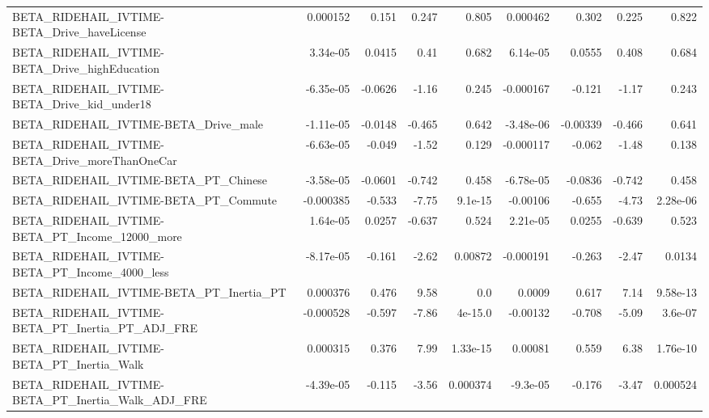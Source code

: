 \begin{tabular}{lrrrrrrrr}
BETA\_RIDEHAIL\_IVTIME-BETA\_Drive\_haveLicense        &    0.000152 &        0.151 &    0.247 &    0.805 &   0.000462 &       0.302 &        0.225 &         0.822 \\
BETA\_RIDEHAIL\_IVTIME-BETA\_Drive\_highEducation      &    3.34e-05 &       0.0415 &     0.41 &    0.682 &   6.14e-05 &      0.0555 &        0.408 &         0.684 \\
BETA\_RIDEHAIL\_IVTIME-BETA\_Drive\_kid\_under18        &   -6.35e-05 &      -0.0626 &    -1.16 &    0.245 &  -0.000167 &      -0.121 &        -1.17 &         0.243 \\
BETA\_RIDEHAIL\_IVTIME-BETA\_Drive\_male               &   -1.11e-05 &      -0.0148 &   -0.465 &    0.642 &  -3.48e-06 &    -0.00339 &       -0.466 &         0.641 \\
BETA\_RIDEHAIL\_IVTIME-BETA\_Drive\_moreThanOneCar     &   -6.63e-05 &       -0.049 &    -1.52 &    0.129 &  -0.000117 &      -0.062 &        -1.48 &         0.138 \\
BETA\_RIDEHAIL\_IVTIME-BETA\_PT\_Chinese               &   -3.58e-05 &      -0.0601 &   -0.742 &    0.458 &  -6.78e-05 &     -0.0836 &       -0.742 &         0.458 \\
BETA\_RIDEHAIL\_IVTIME-BETA\_PT\_Commute               &   -0.000385 &       -0.533 &    -7.75 &  9.1e-15 &   -0.00106 &      -0.655 &        -4.73 &      2.28e-06 \\
BETA\_RIDEHAIL\_IVTIME-BETA\_PT\_Income\_12000\_more     &    1.64e-05 &       0.0257 &   -0.637 &    0.524 &   2.21e-05 &      0.0255 &       -0.639 &         0.523 \\
BETA\_RIDEHAIL\_IVTIME-BETA\_PT\_Income\_4000\_less      &   -8.17e-05 &       -0.161 &    -2.62 &  0.00872 &  -0.000191 &      -0.263 &        -2.47 &        0.0134 \\
BETA\_RIDEHAIL\_IVTIME-BETA\_PT\_Inertia\_PT            &    0.000376 &        0.476 &     9.58 &      0.0 &     0.0009 &       0.617 &         7.14 &      9.58e-13 \\
BETA\_RIDEHAIL\_IVTIME-BETA\_PT\_Inertia\_PT\_ADJ\_FRE    &   -0.000528 &       -0.597 &    -7.86 &  4e-15.0 &   -0.00132 &      -0.708 &        -5.09 &       3.6e-07 \\
BETA\_RIDEHAIL\_IVTIME-BETA\_PT\_Inertia\_Walk          &    0.000315 &        0.376 &     7.99 & 1.33e-15 &    0.00081 &       0.559 &         6.38 &      1.76e-10 \\
BETA\_RIDEHAIL\_IVTIME-BETA\_PT\_Inertia\_Walk\_ADJ\_FRE  &   -4.39e-05 &       -0.115 &    -3.56 & 0.000374 &   -9.3e-05 &      -0.176 &        -3.47 &      0.000524 \\

\end{tabular}
